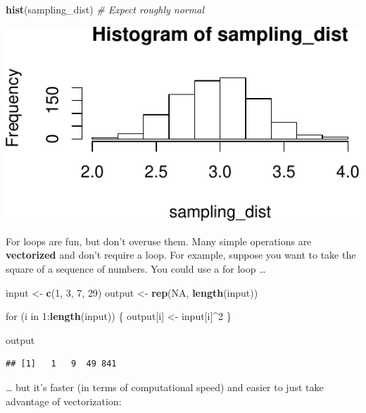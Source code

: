 \documentclass[12pt,oneside,openany]{tufte-book}
\newenvironment{Shaded}{}{}
\newcommand{\KeywordTok}[1]{\textcolor[rgb]{0.00,0.44,0.13}{\textbf{{#1}}}}
\newcommand{\DecValTok}[1]{\textcolor[rgb]{0.25,0.63,0.44}{{#1}}}
\newcommand{\StringTok}[1]{\textcolor[rgb]{0.25,0.44,0.63}{{#1}}}
\newcommand{\CommentTok}[1]{\textcolor[rgb]{0.38,0.63,0.69}{\textit{{#1}}}}
\newcommand{\OtherTok}[1]{\textcolor[rgb]{0.00,0.44,0.13}{{#1}}}
\newcommand{\NormalTok}[1]{{#1}}
\begin{document}
\begin{Shaded}
\begin{Highlighting}[]
\KeywordTok{hist}\NormalTok{(sampling_dist)  }\CommentTok{# Expect roughly normal}
\end{Highlighting}
\end{Shaded}

\includegraphics{pdaps_files/figure-latex/sampling-dist-results-1}

For loops are fun, but don't overuse them. Many simple operations are
\textbf{vectorized} and don't require a loop. For example, suppose you
want to take the square of a sequence of numbers. You could use a for
loop \ldots{}

\begin{Shaded}
\begin{Highlighting}[]
\NormalTok{input <-}\StringTok{ }\KeywordTok{c}\NormalTok{(}\DecValTok{1}\NormalTok{, }\DecValTok{3}\NormalTok{, }\DecValTok{7}\NormalTok{, }\DecValTok{29}\NormalTok{)}
\NormalTok{output <-}\StringTok{ }\KeywordTok{rep}\NormalTok{(}\OtherTok{NA}\NormalTok{, }\KeywordTok{length}\NormalTok{(input))}

\NormalTok{for (i in }\DecValTok{1}\NormalTok{:}\KeywordTok{length}\NormalTok{(input)) \{}
    \NormalTok{output[i] <-}\StringTok{ }\NormalTok{input[i]^}\DecValTok{2}
\NormalTok{\}}

\NormalTok{output}
\end{Highlighting}
\end{Shaded}

\begin{verbatim}
## [1]   1   9  49 841
\end{verbatim}

\ldots{} but it's faster (in terms of computational speed) and easier to
just take advantage of vectorization:
\end{document}
